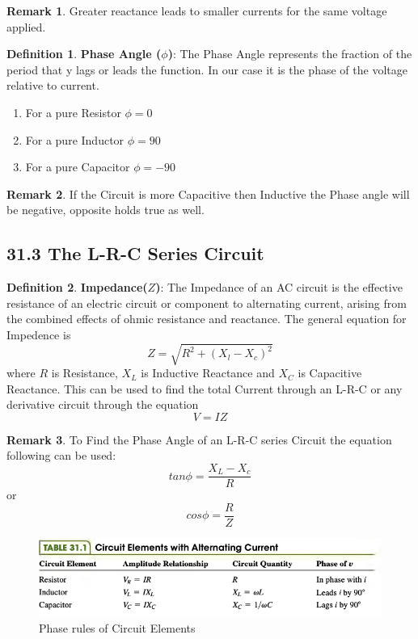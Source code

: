 \documentclass[12pt]{amsart}
\theoremstyle{definition}
\newtheorem{definition}{Definition} %
\newtheorem*{remark}{Remark}        %
\numberwithin{equation}{theorem}    %
\begin{document}
\begin{remark}
    Greater reactance leads to smaller currents for the same voltage applied. 
\end{remark}

\begin{definition}
    \textbf{Phase Angle ($\phi$)}:
    The Phase Angle represents the fraction of the period that y lags or leads the function. In our case it is the phase of the voltage relative to current.
    \begin{enumerate}
        \item For a pure Resistor $\phi = 0$
        \item For a pure Inductor $\phi = 90$
        \item For a pure Capacitor $\phi = -90$
    \end{enumerate}
   
    \begin{remark}
        If the Circuit is more Capacitive then Inductive the Phase angle will be negative, opposite holds true as well.
    \end{remark}
\end{definition}

\subsection*{31.3 The L-R-C Series Circuit}

\begin{definition}
    \textbf{Impedance($Z$)}:
    The Impedance of an AC circuit is the effective resistance of an electric circuit or component to alternating current, arising from the combined effects of ohmic resistance and reactance. The general equation for Impedence is  $$Z = \sqrt{R^2 + (X_l - X_c)^2}$$ where $R$ is Resistance, $X_L$ is Inductive Reactance and $X_C$ is Capacitive Reactance. This can be used to find the total Current through an L-R-C or any derivative circuit through the equation $$V = IZ$$

    \begin{remark}
        To Find the Phase Angle of an L-R-C series Circuit the equation following can be used:
        $$tan\phi = \frac{X_L- X_c}{R}$$
        or
        $$cos\phi = \frac{R}{Z}$$
    \end{remark}
\end{definition}

\begin{figure}[H]
    \centering
    \includegraphics[width=5in]{Media/Elements.png}
    \caption{Phase rules of Circuit Elements}
    \label{Phase Rules of Circuit Elements}
\end{figure}
\end{document}
